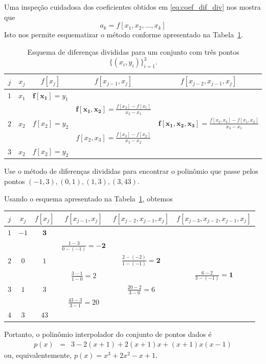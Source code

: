Uma inspeção cuidadosa dos coeficientes obtidos em \eqref{eq:coef_dif_div} nos mostra que
\begin{equation*}
 a_k=f[x_1,x_2,\ldots,x_k] 
\end{equation*}
Isto nos permite esquematizar o método conforme apresentado na Tabela~\ref{tab:esquema_difdiv}. 

\begin{table}
  \centering
  \caption{Esquema de diferenças divididas para um conjunto com três pontos $\{(x_i, y_i)\}_{i=1}^3$.}
  \label{tab:esquema_difdiv}
\begin{tabular}{c||c|ccc}\hline
$j$ & $x_j$ & $f[x_j]$ & $f[x_{j-1},x_j]$ & $f[x_{j-2},x_{j-1},x_j]$ \\\hline
$1$ & $x_1$ & $\pmb{f[x_1]}=y_1$ & &\\
&&&$\displaystyle \pmb{f[x_1,x_2]}=\frac{f[x_2]-f[x_1]}{x_2-x_1}$&\\
$2$ & $x_2$ & $f[x_2] = y_2$ && $\displaystyle \pmb{f[x_1,x_2,x_3]}=\frac{f[x_2,x_3]-f[x_1,x_2]}{x_3-x_1}$\\
&&&$\displaystyle f[x_2,x_3]=\frac{f[x_3]-f[x_2]}{x_3-x_2}$ &\\
$3$ & $x_2$ & $f[x_2]=y_2$ &&\\\hline
\end{tabular}
\end{table}

\begin{ex}
Use o método de diferenças divididas para encontrar o polinômio que passe pelos pontos $(-1,3),(0,1),(1,3),(3,43)$.
\end{ex}
\begin{sol}
Usando o esquema apresentado na Tabela~\ref{tab:esquema_difdiv}, obtemos
\begin{center}
\begin{tabular}{c||c|cccc}\hline
 $j$ & $x_j$ & $f[x_j]$ & $f[x_{j-1},x_j]$ & $f[x_{j-2},x_{j-1},x_j]$ & $f[x_{j-3},x_{j-2},x_{j-1},x_j]$\\\hline
$1$ & $-1$ & $\pmb{3}$&&&\\
&&&$\displaystyle \frac{1-3}{0-(-1)}=\pmb{-2}$&&\\
$2$&$0$&$1$&&$\displaystyle \frac{2-(-2)}{1-(-1)}=\pmb{2}$&\\
&&&$\displaystyle \frac{3-1}{1-0}=2$&&$\displaystyle\frac{6-2}{3-(-1)}=\pmb{1}$\\
$3$&$1$&$3$&&$\displaystyle \frac{20-2}{3-0}=6$&\\
&&&$\displaystyle \frac{43-3}{3-1}=20$&&\\
$4$&$3$&$43$&&&\\\hline
\end{tabular}  
\end{center}
Portanto, o polinômio interpolador do conjunto de pontos dados é
\begin{eqnarray*}
p(x)&=&3-2(x+1)+2(x+1)x+(x+1)x(x-1)
\end{eqnarray*}
ou, equivalentemente, $p(x) = x^3+2x^2-x+1$.
\end{sol}

